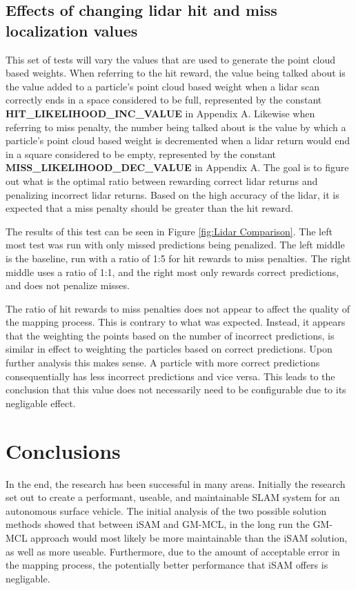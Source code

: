 \documentclass[10pt]{IEEEtran}
\begin{document}
\subsection{Effects of changing lidar hit and miss localization values}
This set of tests will vary the values that are used to generate the point cloud based
weights.  When referring to the hit reward, the value being talked about is the value added to a particle's point cloud based
weight when a lidar scan correctly ends in a space considered to be full, represented
by the constant \textbf{HIT\_LIKELIHOOD\_INC\_VALUE} in Appendix A.
Likewise when referring to miss penalty, the number being talked about
is the value by which a particle's point cloud based weight is decremented when a lidar 
return would end in a square considered to be empty, represented by the constant
\textbf{MISS\_LIKELIHOOD\_DEC\_VALUE} in Appendix A. 
The goal is to figure out what is the optimal 
ratio between rewarding correct lidar returns and penalizing incorrect lidar returns.
Based on the high accuracy of the lidar, it is expected that a miss penalty should be
greater than the hit reward.  

The results of this test can be seen in Figure \ref{fig:Lidar Comparison}.  The left most
test was run with only missed predictions being penalized.  The left middle is the baseline, run
with a ratio of 1:5 for hit rewards to miss penalties.  The right middle uses a ratio of 1:1,
and the right most only rewards correct predictions, and does not penalize misses.

The ratio of hit rewards to miss penalties does not appear to affect the quality of the
mapping process.   This is contrary to what was expected.  Instead, it appears that the 
weighting the points based on the number of incorrect predictions,
is similar in effect to weighting the particles based on correct predictions.  Upon
further analysis this makes sense.  A particle with more correct predictions consequentially
has less incorrect predictions and vice versa.  This leads to the conclusion that this
value does not necessarily need to be configurable due to its negligable effect.

\section{Conclusions}
In the end, the research has been successful in many areas.  Initially the research set out
to create a performant, useable, and maintainable SLAM system for an autonomous surface
vehicle. The initial analysis of the two possible solution methods showed that between 
iSAM and GM-MCL, in the long run the GM-MCL approach would most likely be more
maintainable than the iSAM solution, as well as more useable. Furthermore, due to the 
amount of acceptable error in the mapping process, the potentially better performance that
iSAM offers is negligable.
\end{document}

